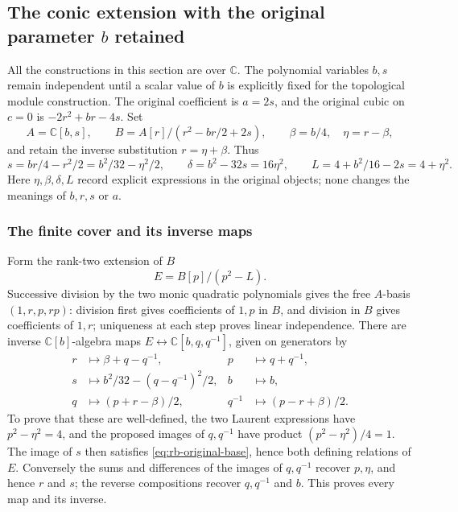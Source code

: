 \subsection{The conic extension with the original parameter \texorpdfstring{$b$}{b} retained}
\label{sec:retained-b-conic}
All the constructions in this section are over $\mathbb C$. The
polynomial variables $b,s$ remain independent until a scalar value of
$b$ is explicitly fixed for the topological module construction.
The original coefficient is $a=2s$, and the original cubic on $c=0$ is
$-2r^2+br-4s$. Set
\[
 A=\mathbb C[b,s],\qquad
 B=A[r]/(r^2-br/2+2s),\qquad
 \beta=b/4,\quad \eta=r-\beta,
\]
and retain the inverse substitution $r=\eta+\beta$. Thus
\begin{equation}\label{eq:rb-original-base}
 s=br/4-r^2/2=b^2/32-\eta^2/2,\qquad
 \delta=b^2-32s=16\eta^2,\qquad
 L=4+b^2/16-2s=4+\eta^2.
\end{equation}
Here $\eta,\beta,\delta,L$ record explicit expressions in the original
objects; none changes the meanings of $b,r,s$ or $a$.

\subsubsection{The finite cover and its inverse maps}
Form the rank-two extension of $B$
\[
 E=B[p]/(p^2-L).
\]
Successive division by the two monic quadratic polynomials gives
the free $A$-basis $(1,r,p,rp)$: division first gives coefficients
of $1,p$ in $B$, and division in $B$ gives coefficients of $1,r$;
uniqueness at each step proves linear independence. There are inverse
$\mathbb C[b]$-algebra maps $E\longleftrightarrow\mathbb C[b,q,q^{-1}]$,
given on generators by
\begin{equation}\label{eq:rb-conic-maps}
 \begin{aligned}
 r&\longmapsto\beta+q-q^{-1},& p&\longmapsto q+q^{-1},\\
 s&\longmapsto b^2/32-(q-q^{-1})^2/2,& b&\longmapsto b,\\
 q&\longmapsto(p+r-\beta)/2,&q^{-1}&\longmapsto(p-r+\beta)/2.
 \end{aligned}
\end{equation}
To prove that these are well-defined, the two Laurent expressions
have $p^2-\eta^2=4$, and the proposed images of $q,q^{-1}$ have
product $(p^2-\eta^2)/4=1$. The image of $s$ then satisfies
\eqref{eq:rb-original-base}, hence both defining relations of $E$.
Conversely the sums and differences of the images of $q,q^{-1}$
recover $p,\eta$, and hence $r$ and $s$; the reverse compositions
recover $q,q^{-1}$ and $b$. This proves every map and its inverse.

